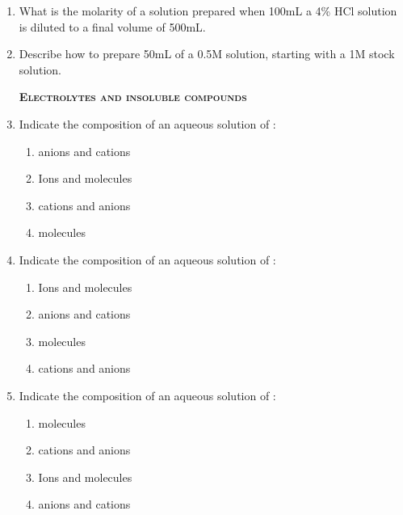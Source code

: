 \documentclass[main.tex]{subfiles}
\begin{document}
\begin{multicols*}{2}
\begin{enumerate}
\item What is the molarity of a solution prepared when 100mL a 4\% HCl solution is diluted to a final volume of 500mL.
\begin{enumerate}[label=(\alph*)]
\end{enumerate}

\item Describe how to prepare 50mL of a 0.5M  solution, starting with a 1M stock  solution.


{\raggedright\textsc{\textbf{Electrolytes and insoluble compounds}}\par}

\item Indicate the composition of an aqueous solution of :
\begin{enumerate}[label=(\alph*)]
\item {} anions and  cations %
\item Ions and molecules %
\item {} cations and  anions %
\item {} molecules %
\end{enumerate}

\item Indicate the composition of an aqueous solution of :
\begin{enumerate}[label=(\alph*)]
\item Ions and molecules %
\item {} anions and  cations  %
\item  {} molecules %
\item {} cations and  anions  %
\end{enumerate}

\item Indicate the composition of an aqueous solution of :
\begin{enumerate}[label=(\alph*)]
\item {} molecules  %
\item {} cations and  anions   %
\item   Ions and molecules %
\item   {} anions and  cations %
\end{enumerate}


\end{enumerate}
\end{multicols*}
\end{document}
